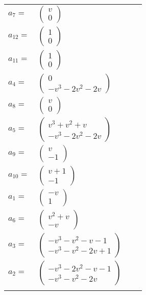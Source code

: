 \documentclass[1p]{elsarticle_modified}
\theoremstyle{definition}
\begin{document}
\begin{tabular}{m{7pt} m{180pt} m{7pt} m{180pt} }
\flushright $a_{7}=$&$\begin{pmatrix}v\\0\end{pmatrix}$ \\
\flushright $a_{12}=$&$\begin{pmatrix}1\\0\end{pmatrix}$ \\
\flushright $a_{11}=$&$\begin{pmatrix}1\\0\end{pmatrix}$ \\
\flushright $a_{4}=$&$\begin{pmatrix}0\\- v^3-2 v^2-2 v\end{pmatrix}$ \\
\flushright $a_{8}=$&$\begin{pmatrix}v\\0\end{pmatrix}$ \\
\flushright $a_{5}=$&$\begin{pmatrix}v^3+v^2+v\\- v^3-2 v^2-2 v\end{pmatrix}$ \\
\flushright $a_{9}=$&$\begin{pmatrix}v\\-1\end{pmatrix}$ \\
\flushright $a_{10}=$&$\begin{pmatrix}v+1\\-1\end{pmatrix}$ \\
\flushright $a_{1}=$&$\begin{pmatrix}- v\\1\end{pmatrix}$ \\
\flushright $a_{6}=$&$\begin{pmatrix}v^2+v\\- v\end{pmatrix}$ \\
\flushright $a_{3}=$&$\begin{pmatrix}- v^3- v^2- v-1\\- v^3- v^2-2 v+1\end{pmatrix}$ \\
\flushright $a_{2}=$&$\begin{pmatrix}- v^3-2 v^2- v-1\\- v^3- v^2-2 v\end{pmatrix}$\\&\end{tabular}
\end{document}
